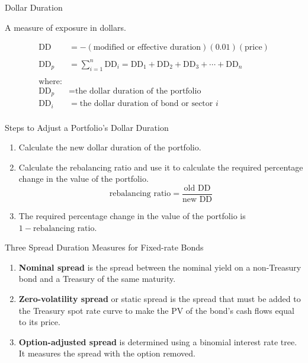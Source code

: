 \documentclass[../custom]{flashcards}
\begin{document}
\begin{flashcard}{Dollar Duration}
    \begin{flushleft}
        A measure of exposure in dollars.
    \end{flushleft}
    \begin{align*}
        \text{DD} &= -(\text{modified or effective duration})(0.01)(\text{price})\\
        \\
        \text{DD}_p &= \sum_{i=1}^n \text{DD}_i = \text{DD}_1 + \text{DD}_2 + \text{DD}_3 + \cdots + \text{DD}_n\\
        \\
        \text{where:}\\
        \text{DD}_p &= \text{the dollar duration of the portfolio}\\
        \text{DD}_i &= \text{the dollar duration of bond or sector $i$}\\
    \end{align*}
\end{flashcard}

\begin{flashcard}{Steps to Adjust a Portfolio's Dollar Duration}
    \begin{enumerate}
        \item Calculate the new dollar duration of the portfolio.
        \item Calculate the rebalancing ratio and use it to calculate the required percentage change in the value of the portfolio.
        \[
            \text{rebalancing ratio} = \frac{\text{old $\text{DD}$}}{\text{new $\text{DD}$}}
        \]
        \item The required percentage change in the value of the portfolio is $1 - \text{rebalancing ratio}$.
    \end{enumerate}
\end{flashcard}

\begin{flashcard}{Three Spread Duration Measures for Fixed-rate Bonds}
    \begin{enumerate}
        \item \textbf{Nominal spread} is the spread between the nominal yield on a non-Treasury bond and a Treasury of the same maturity.
        \item \textbf{Zero-volatility spread} or static spread is the spread that must be added to the Treasury spot rate curve to make the PV of the bond's cash flows equal to its price.
        \item \textbf{Option-adjusted spread} is determined using a binomial interest rate tree. It measures the spread with the option removed.
    \end{enumerate}
\end{flashcard}
\end{document}
